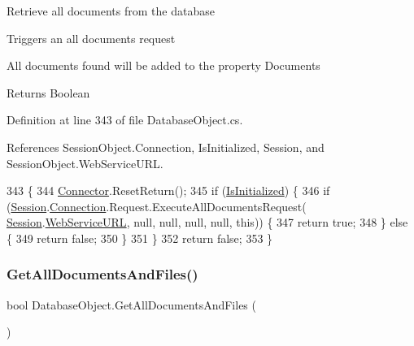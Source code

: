 Retrieve all documents from the database 

Triggers an all documents request

All documents found will be added to the property \textquotesingle{}Documents\textquotesingle{}

\begin{DoxyReturn}{Returns}
Boolean
\end{DoxyReturn}


Definition at line 343 of file Database\+Object.\+cs.



References Session\+Object.\+Connection, Is\+Initialized, Session, and Session\+Object.\+Web\+Service\+U\+RL.


\begin{DoxyCode}
343                                   \{
344         \mbox{\hyperlink{class_connector}{Connector}}.ResetReturn();
345         \textcolor{keywordflow}{if} (\mbox{\hyperlink{class_database_object_a5fe036d32a30eb10d1b3f6a30263f740}{IsInitialized}}) \{
346             \textcolor{keywordflow}{if} (\mbox{\hyperlink{class_database_object_aa8484162b7d2a7c4c9426bca13c64c07}{Session}}.\mbox{\hyperlink{class_session_object_a014bdbf705a753540e19bfb53030c55c}{Connection}}.Request.ExecuteAllDocumentsRequest(
      \mbox{\hyperlink{class_database_object_aa8484162b7d2a7c4c9426bca13c64c07}{Session}}.\mbox{\hyperlink{class_session_object_a697c071c812fbf7ad1166b896fb44c16}{WebServiceURL}}, null, null, null, null, \textcolor{keyword}{this})) \{
347                 \textcolor{keywordflow}{return} \textcolor{keyword}{true};
348             \} \textcolor{keywordflow}{else} \{
349                 \textcolor{keywordflow}{return} \textcolor{keyword}{false};
350             \}
351         \}
352         \textcolor{keywordflow}{return} \textcolor{keyword}{false};
353     \}
\end{DoxyCode}
\mbox{\label{class_database_object_a72239fa2b2a549665e45cdd340cd70a0}} 
\subsubsection{\texorpdfstring{Get\+All\+Documents\+And\+Files()}{GetAllDocumentsAndFiles()}}
{\footnotesize\ttfamily bool Database\+Object.\+Get\+All\+Documents\+And\+Files (\begin{DoxyParamCaption}{ }\end{DoxyParamCaption})}



